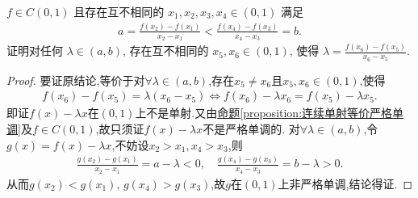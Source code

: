 \documentclass[../../main.tex]{subfiles}
\begin{document}
\begin{example}
$f \in C(0,1)$ 且存在互不相同的 $x_1, x_2, x_3, x_4 \in (0,1)$ 满足
\begin{align*}
a = \frac{f(x_2) - f(x_1)}{x_2 - x_1} < \frac{f(x_4) - f(x_3)}{x_4 - x_3} = b.
\end{align*}
证明对任何 $\lambda \in (a, b)$, 存在互不相同的 $x_5, x_6 \in (0,1)$, 使得 $\lambda = \frac{f(x_6) - f(x_5)}{x_6 - x_5}$.
\end{example}
\begin{proof}
要证原结论,等价于对$\forall \lambda \in (a,b)$,存在$x_5 \ne x_6$且$x_5,x_6 \in (0,1)$,使得
\begin{align*}
f(x_6) -f(x_5) = \lambda (x_6-x_5) \Leftrightarrow f(x_6) -\lambda x_6=f(x_5) -\lambda x_5.
\end{align*}
即证$f(x) -\lambda x$在$(0,1)$上不是单射.又由\hyperref[proposition:连续单射等价严格单调]{命题\ref{proposition:连续单射等价严格单调}}及$f\in C(0,1)$,故只须证$f(x) -\lambda x$不是严格单调的.
对$\forall \lambda \in (a,b)$,令$g(x) =f(x) -\lambda x$,不妨设$x_2>x_1,x_4>x_3$,则  
\begin{align*}
\frac{g(x_2) -g(x_1)}{x_2-x_1}=a-\lambda <0,\quad \frac{g(x_4) -g(x_3)}{x_4-x_3}=b-\lambda >0.
\end{align*}
从而$g(x_2) <g(x_1)$, $g(x_4) >g(x_3)$,故$g$在$(0,1)$上非严格单调,结论得证.
\end{proof}
\end{document}

